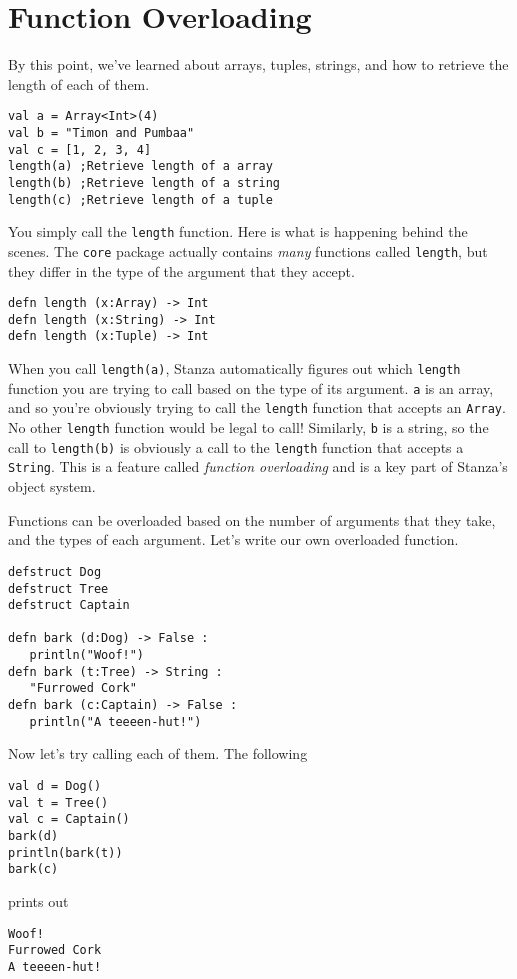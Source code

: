 \documentclass[10pt,oneside]{book}
\begin{document}
\section{Function Overloading}
By this point, we've learned about arrays, tuples, strings, and how to retrieve the length of each of them.
\begin{lstlisting}
val a = Array<Int>(4)
val b = "Timon and Pumbaa"
val c = [1, 2, 3, 4]
length(a) ;Retrieve length of a array
length(b) ;Retrieve length of a string
length(c) ;Retrieve length of a tuple
\end{lstlisting}
You simply call the \texttt{\frenchspacing length} function. Here is what is happening behind the scenes. The \texttt{\frenchspacing core} package actually contains {\em many} functions called \texttt{\frenchspacing length}, but they differ in the type of the argument that they accept. 
\begin{lstlisting}
defn length (x:Array) -> Int
defn length (x:String) -> Int
defn length (x:Tuple) -> Int
\end{lstlisting}
When you call \texttt{\frenchspacing length(a)}, Stanza automatically figures out which \texttt{\frenchspacing length} function you are trying to call based on the type of its argument. \texttt{\frenchspacing a} is an array, and so you're obviously trying to call the \texttt{\frenchspacing length} function that accepts an \texttt{\frenchspacing Array}. No other \texttt{\frenchspacing length} function would be legal to call! Similarly, \texttt{\frenchspacing b} is a string, so the call to \texttt{\frenchspacing length(b)} is obviously a call to the \texttt{\frenchspacing length} function that accepts a \texttt{\frenchspacing String}. This is a feature called {\em function overloading} and is a key part of Stanza's object system. 

Functions can be overloaded based on the number of arguments that they take, and the types of each argument. Let's write our own overloaded function.
\begin{lstlisting}
defstruct Dog
defstruct Tree
defstruct Captain

defn bark (d:Dog) -> False :
   println("Woof!")
defn bark (t:Tree) -> String :
   "Furrowed Cork"
defn bark (c:Captain) -> False :
   println("A teeeen-hut!")
\end{lstlisting}
Now let's try calling each of them. The following
\begin{lstlisting}
val d = Dog()
val t = Tree()
val c = Captain()
bark(d)
println(bark(t))
bark(c)
\end{lstlisting}
prints out
\begin{lstlisting}
Woof!
Furrowed Cork
A teeeen-hut!
\end{lstlisting}
\end{document}
